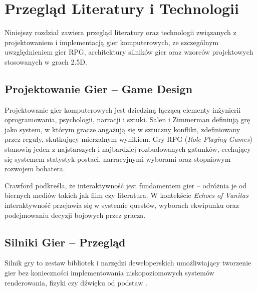 \newcommand{\package}[1]{\textbf{#1}}
\newcommand{\cmmd}[1]{\textbackslash\texttt{#1}}

\chapter{Przegląd Literatury i Technologii}

Niniejszy rozdział zawiera przegląd literatury oraz technologii związanych z projektowaniem i implementacją gier komputerowych, ze szczególnym uwzględnieniem gier RPG, architektury silników gier oraz wzorców projektowych stosowanych w grach 2.5D.

\section{Projektowanie Gier – Game Design}

Projektowanie gier komputerowych jest dziedziną łączącą elementy inżynierii oprogramowania, psychologii, narracji i sztuki. Salen i Zimmerman \cite{salen2004rules} definiują grę jako system, w którym gracze angażują się w sztuczny konflikt, zdefiniowany przez reguły, skutkujący mierzalnym wynikiem. Gry RPG (\textit{Role-Playing Games}) stanowią jeden z najstarszych i najbardziej rozbudowanych gatunków, cechujący się systemem statystyk postaci, narracyjnymi wyborami oraz stopniowym rozwojem bohatera.

Crawford \cite{crawford2003chris} podkreśla, że interaktywność jest fundamentem gier – odróżnia je od biernych mediów takich jak film czy literatura. W kontekście \textit{Echoes of Vanitas} interaktywność przejawia się w systemie questów, wyborach ekwipunku oraz podejmowaniu decyzji bojowych przez gracza.

\section{Silniki Gier – Przegląd}

Silnik gry to zestaw bibliotek i narzędzi deweloperskich umożliwiający tworzenie gier bez konieczności implementowania niskopoziomowych systemów renderowania, fizyki czy dźwięku od podstaw \cite{gregory2018game}.


